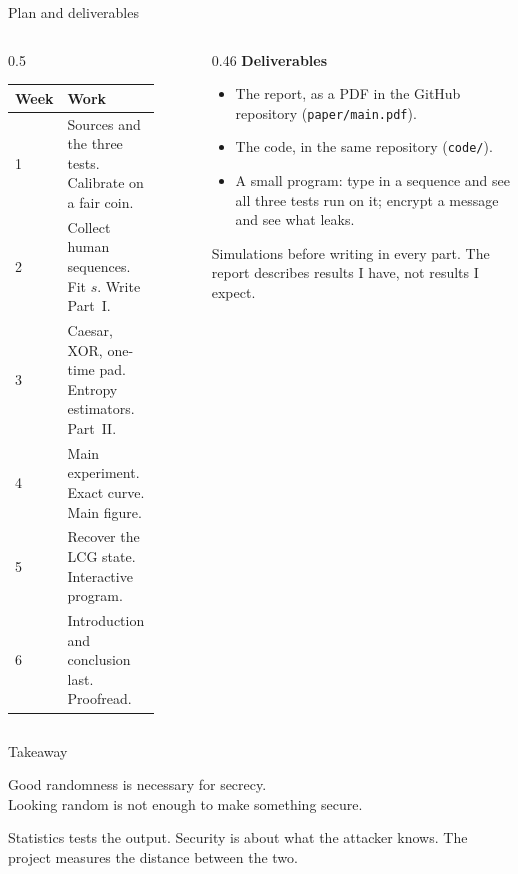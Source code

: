 \documentclass[10pt,aspectratio=169]{beamer}
\begin{document}
\begin{frame}{Plan and deliverables}
  \begin{columns}[T]
    \begin{column}{0.5\textwidth}
      \small
      \begin{tabular}{@{}lp{0.8\linewidth}@{}}
        \toprule
        Week & Work \\
        \midrule
        1 & Sources and the three tests. Calibrate on a fair coin. \\
        2 & Collect human sequences. Fit $s$. Write Part~I. \\
        3 & Caesar, XOR, one-time pad. Entropy estimators. Part~II. \\
        4 & Main experiment. Exact curve. Main figure. \\
        5 & Recover the LCG state. Interactive program. \\
        6 & Introduction and conclusion last. Proofread. \\
        \bottomrule
      \end{tabular}
    \end{column}
    \begin{column}{0.46\textwidth}
      \textbf{Deliverables}
      \begin{itemize}
        \item The report, as a PDF in the GitHub repository
              (\texttt{paper/main.pdf}).
        \item The code, in the same repository (\texttt{code/}).
        \item A small program: type in a sequence and see all three
              tests run on it; encrypt a message and see what leaks.
      \end{itemize}
      \medskip
      Simulations before writing in every part. The report describes
      results I have, not results I expect.
    \end{column}
  \end{columns}
\end{frame}

\begin{frame}{Takeaway}
  \begin{center}
    \Large Good randomness is necessary for secrecy.\\[0.5em]
    Looking random is not enough to make something secure.
  \end{center}
  \bigskip
  \begin{center}
    \small
    Statistics tests the output. Security is about what the attacker
    knows. The project measures the distance between the two.
  \end{center}
\end{frame}
\end{document}
